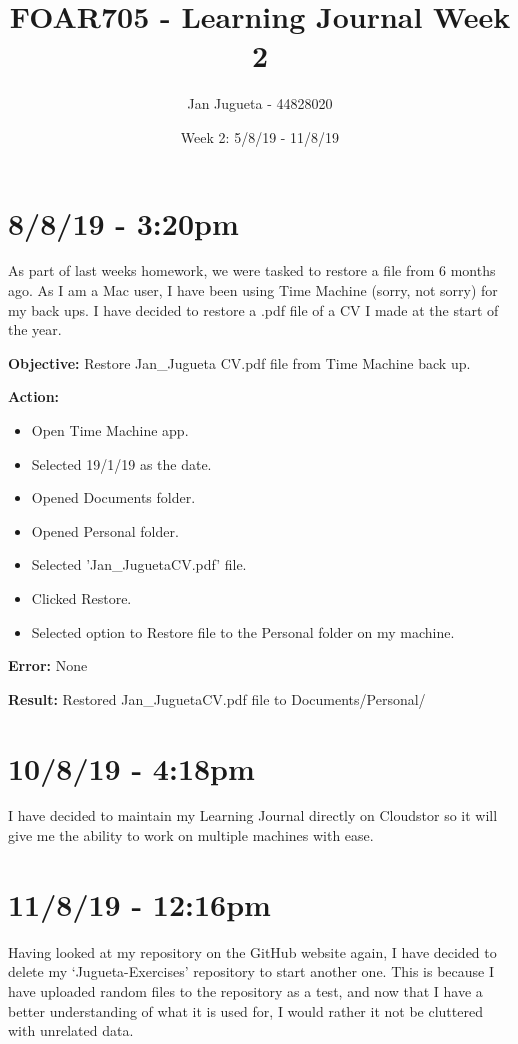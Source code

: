 \documentclass{article}
\title{FOAR705 - Learning Journal Week 2}
\author{Jan Jugueta - 44828020}
\date{Week 2: 5/8/19 - 11/8/19}
\begin{document}
\maketitle

\section*{8/8/19 - 3:20pm}

As part of last weeks homework, we were tasked to restore a file from 6 months ago. As I am a Mac user, I have been using Time Machine (sorry, not sorry) for my back ups. I have decided to restore a .pdf file of a CV I made at the start of the year.

\textbf{Objective:} Restore Jan\_Jugueta CV.pdf file from Time Machine back up.

\textbf{Action:}
\begin{itemize}
    \item Open Time Machine app.
    \item Selected 19/1/19 as the date.
    \item Opened Documents folder.
    \item Opened Personal folder.
    \item Selected 'Jan\_JuguetaCV.pdf' file.
    \item Clicked Restore.
    \item Selected option to Restore file to the Personal folder on my machine.
\end{itemize}  

\textbf{Error:} None

\textbf{Result:} Restored Jan\_JuguetaCV.pdf file to Documents/Personal/

\section*{10/8/19 - 4:18pm}

I have decided to maintain my Learning Journal directly on Cloudstor so it will give me the ability to work on multiple machines with ease. 

\section*{11/8/19 - 12:16pm}

Having looked at my repository on the GitHub website again, I have decided to delete my ‘Jugueta-Exercises’ repository to start another one. This is because I have uploaded random files to the repository as a test, and now that I have a better understanding of what it is used for, I would rather it not be cluttered with unrelated data.
\end{document}
